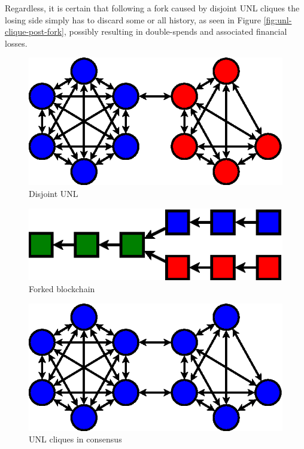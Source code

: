 \documentclass{article}
\begin{document}
Regardless, it is certain that following a fork caused by disjoint UNL cliques
the losing side simply has to discard some or all history, as seen in Figure
\ref{fig:unl-clique-post-fork}, possibly resulting in double-spends and
associated financial losses.

\begin{figure}
    \centering
    \includegraphics{figures/unl-clique-disjoint.eps}
    \caption{Disjoint UNL}
    \label{fig:unl-clique-disjoint}
\end{figure}

\begin{figure}
    \centering
    \includegraphics{figures/unl-clique-disjoint-blockchain.eps}
    \caption{Forked blockchain}
    \label{fig:unl-clique-disjoint-blockchain}
\end{figure}

\begin{figure}
    \centering
    \includegraphics{figures/unl-clique-consensus.eps}
    \caption{UNL cliques in consensus}
    \label{fig:unl-clique-consensus}
\end{figure}
\end{document}
